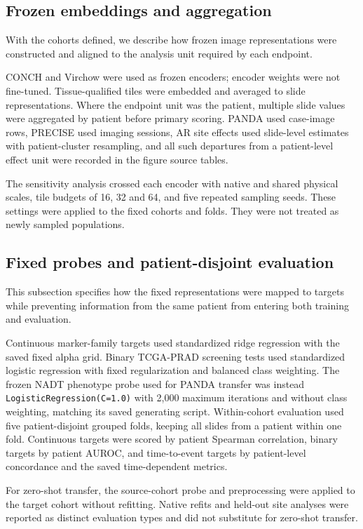\subsection{Frozen embeddings and aggregation}

With the cohorts defined, we describe how frozen image representations were constructed and
aligned to the analysis unit required by each endpoint.

CONCH and Virchow were used as frozen encoders; encoder weights were not fine-tuned.
Tissue-qualified tiles were embedded and averaged to slide representations. Where the
endpoint unit was the patient, multiple slide values were aggregated by patient before
primary scoring. PANDA used case-image rows, PRECISE used imaging sessions, AR site effects
used slide-level estimates with patient-cluster resampling, and all such departures from a
patient-level effect unit were recorded in the figure source tables.

The sensitivity analysis crossed each encoder with native and shared physical scales, tile
budgets of 16, 32 and 64, and five repeated sampling seeds. These settings were applied to
the fixed cohorts and folds. They were not treated as newly sampled populations.

\subsection{Fixed probes and patient-disjoint evaluation}

This subsection specifies how the fixed representations were mapped to targets while
preventing information from the same patient from entering both training and evaluation.

Continuous marker-family targets used standardized ridge regression with the saved fixed
alpha grid. Binary TCGA-PRAD screening tests used standardized logistic regression with
fixed regularization and balanced class weighting. The frozen NADT phenotype probe used for
PANDA transfer was instead \texttt{LogisticRegression(C=1.0)} with 2,000 maximum iterations
and without class weighting, matching its saved generating script. Within-cohort evaluation
used five patient-disjoint grouped folds, keeping all slides from a patient within one fold.
Continuous targets were scored by patient Spearman correlation, binary targets by patient
AUROC, and time-to-event targets by patient-level concordance and the saved time-dependent
metrics.

For zero-shot transfer, the source-cohort probe and preprocessing were applied to the target
cohort without refitting. Native refits and held-out site analyses were reported as distinct
evaluation types and did not substitute for zero-shot transfer.

